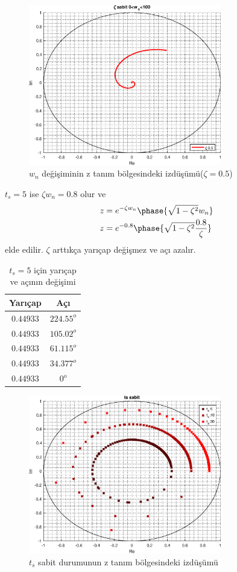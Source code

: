 \begin{figure}[!htb]
    \centering
    \includegraphics[width=0.75\textwidth]{img/lec6_plot3}
    \caption{$w_n$ değişiminin z tanım bölgesindeki izdüşümü($\zeta=0.5$)}
    \label{fig:lec6_plot3}
\end{figure}
$t_s=5$ ise $\zeta w_n=0.8$ olur ve 
\begin{equation}
\begin{split}
    z&=e^{-\zeta w_n}\phase{\sqrt{1-\zeta^2}w_n}\\
    z&=e^{-0.8}\phase{\sqrt{1-\zeta^2}\frac{0.8}{\zeta}}
\end{split}
\end{equation}
elde edilir. $\zeta$ arttıkça yarıçap değişmez ve açı azalır. 
\begin{table}[!htb]
    \centering
    \caption{$t_s=5$ için yarıçap ve açının değişimi}\label{tbl:yaricap_aci3}
    \begin{tabular}{cc}\hline
        Yarıçap& Açı\\\hline
        $0.44933$& $224.55^o$\\
        $0.44933$& $105.02^o$\\
        $0.44933$& $61.115^o$\\
        $0.44933$& $34.377^o$\\
        $0.44933$& $     0^o$\\\hline
    \end{tabular}
\end{table}

\begin{figure}[!htb]
    \centering
    \includegraphics[width=0.75\textwidth]{img/lec6_plot4}
    \caption{$t_s$ sabit durumunun z tanım bölgesindeki izdüşümü}
    \label{fig:lec6_plot4}
\end{figure}

